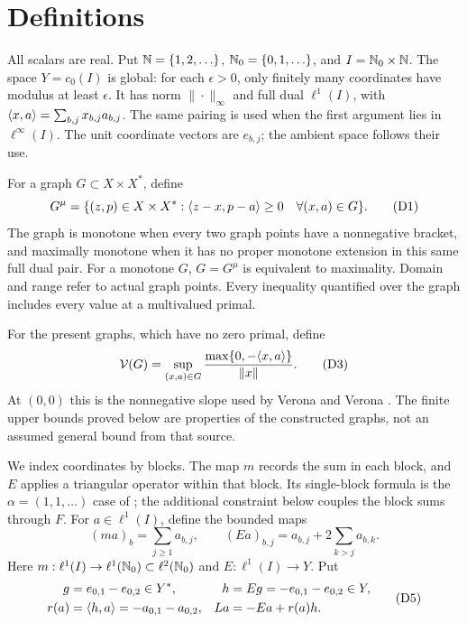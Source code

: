 \section{Definitions}
\label{sec:definitions}
All scalars are real. Put $\mathbb N=\{1,2,\ldots\}$, $\mathbb N_0=\{0,1,\ldots\}$,
and $I=\mathbb N_0\times\mathbb N$. The space $Y=c_0(I)$ is global: for each
$\epsilon>0$, only finitely many coordinates have modulus at least
$\epsilon$. It has norm $\|\cdot\|_\infty$ and full dual $\ell^1(I)$,
with $\langle x,a\rangle=\sum_{b,j}x_{b,j}a_{b,j}$.
The same pairing is used when the first argument lies in $\ell^\infty(I)$.
The unit coordinate vectors are $e_{b,j}$; the ambient space follows their use.

For a graph $G\subset X\times X^*$, define
\begin{equation}
G^\mu=\{(z,p)\in X\times X^*:
 \langle z-x,p-a\rangle\ge0\quad\forall(x,a)\in G\}.
\tag{D1}\label{eq:D1}
\end{equation}
The graph is monotone when every two graph points have a nonnegative bracket,
and maximally monotone when it has no proper monotone extension in this same
full dual pair. For a monotone $G$, $G=G^\mu$ is equivalent to maximality.
Domain and range refer to actual graph points. Every inequality quantified
over the graph includes every value at a multivalued primal.


For the present graphs, which have no zero primal, define
\begin{equation}
\mathcal V(G)=\sup_{(x,a)\in G}
 \frac{\max\{0,-\langle x,a\rangle\}}{\|x\|}.
\tag{D3}\label{eq:D3}
\end{equation}
At $(0,0)$ this is the nonnegative slope used by Verona and Verona
\cite{verona2008}. The finite upper bounds proved below are properties
of the constructed graphs, not an assumed general bound from that source.

We index coordinates by blocks. The map $m$ records the sum in each block,
and $E$ applies a triangular operator within that block. Its single-block
formula is the $\alpha=(1,1,\ldots)$ case of
\cite[author version, Example~4.1]{bauschkeetal2011}; the additional constraint below
couples the block sums through $F$.
For $a\in\ell^1(I)$, define the bounded maps
\begin{equation}
(ma)_b=\sum_{j\ge1}a_{b,j},\qquad
(Ea)_{b,j}=a_{b,j}+2\sum_{k>j}a_{b,k}.
\tag{D4}\label{eq:D4}
\end{equation}
Here $m:\ell^1(I)\to\ell^1(\mathbb N_0)\subset\ell^2(\mathbb N_0)$ and
$E:\ell^1(I)\to Y$. Put
\begin{equation}
\begin{aligned}
g&=e_{0,1}-e_{0,2}\in Y^*,&
h&=Eg=-e_{0,1}-e_{0,2}\in Y,\\
r(a)&=\langle h,a\rangle=-a_{0,1}-a_{0,2},&
La&=-Ea+r(a)h.
\end{aligned}
\tag{D5}\label{eq:D5}
\end{equation}

